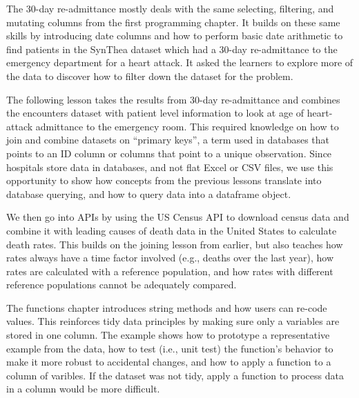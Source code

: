 \documentclass[030-workshop.tex]{subfiles}
\begin{document}
        The 30-day re-admittance mostly deals with the same selecting, filtering, and mutating columns
        from the first programming chapter.
        It builds on these same skills by introducing date columns and how to perform basic date arithmetic
        to find patients in the SynThea dataset which had a 30-day re-admittance to the emergency department for a heart attack.
        It asked the learners to explore more of the data to discover how to filter down the dataset for the problem.

        The following lesson takes the results from 30-day re-admittance and combines the encounters dataset with
        patient level information to look at age of heart-attack admittance to the emergency room.
        This required knowledge on how to join and combine datasets on ``primary keys'',
        a term used in databases that points to an ID column or columns that point to a unique observation.
        Since hospitals store data in databases, and not flat Excel or CSV files,
        we use this opportunity to show how concepts from the previous lessons translate into database querying,
        and how to query data into a dataframe object.

        We then go into APIs by using the US Census API to download census data and combine it with
        leading causes of death data in the United States to calculate death rates.
        This builds on the joining lesson from earlier,
        but also teaches how rates always have a time factor involved (e.g., deaths over the last year),
        how rates are calculated with a reference population,
        and how rates with different reference populations cannot be adequately compared.

        The functions chapter introduces string methods and how users can re-code values.
        This reinforces tidy data principles by making sure only a variables are stored in one column.
        The example shows how to prototype a representative example from the data,
        how to test (i.e., unit test) the function's behavior to make it more robust to accidental changes,
        and how to apply a function to a column of varibles.
        If the dataset was not tidy,
        apply a function to process data in a column would be more difficult.
\end{document}
